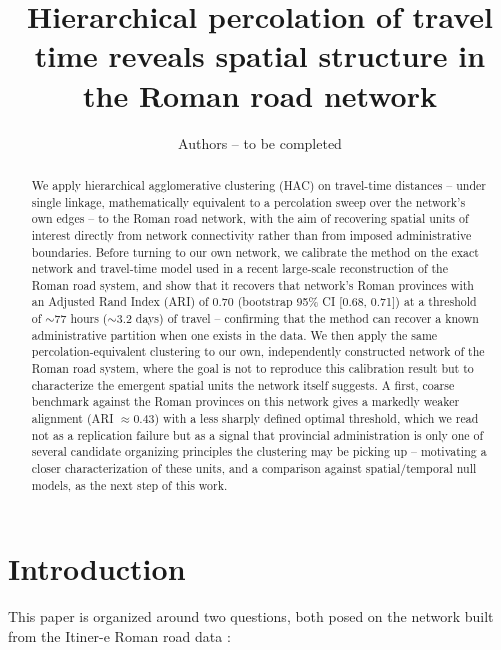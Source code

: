 \documentclass[11pt,a4paper]{article}
\title{Hierarchical percolation of travel time reveals spatial structure
  in the Roman road network}
\author[1]{Authors -- to be completed}
\affil[1]{[Affiliations -- to be completed]}
\date{}
\begin{document}
\maketitle

\begin{abstract}
We apply hierarchical agglomerative clustering (HAC) on travel-time
distances -- under single linkage, mathematically equivalent to a
percolation sweep over the network's own edges -- to the Roman road
network, with the aim of recovering spatial units of interest directly
from network connectivity rather than from imposed administrative
boundaries. Before turning to our own network, we calibrate the method
on the exact network and travel-time model used in a recent large-scale
reconstruction of the Roman road system, and show that it recovers that
network's Roman provinces with an Adjusted Rand Index (ARI) of 0.70
(bootstrap 95\% CI [0.68, 0.71]) at a threshold of $\sim$77 hours
($\sim$3.2 days) of travel -- confirming that the method can recover a
known administrative partition when one exists in the data. We then
apply the same percolation-equivalent clustering to our own,
independently constructed network of the Roman road system, where the
goal is not to reproduce this calibration result but to characterize
the emergent spatial units the network itself suggests. A first,
coarse benchmark against the Roman provinces on this network gives a
markedly weaker alignment (ARI $\approx 0.43$) with a less sharply
defined optimal threshold, which we read not as a replication failure
but as a signal that provincial administration is only one of several
candidate organizing principles the clustering may be picking up --
motivating a closer characterization of these units, and a comparison
against spatial/temporal null models, as the next step of this work.
\end{abstract}

\section{Introduction}
\label{sec:intro}

This paper is organized around two questions, both posed on the network
built from the Itiner-e Roman road data \citep{desoto2025itinere}:
\end{document}
